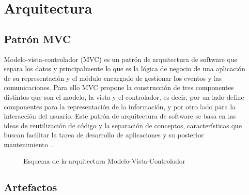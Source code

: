\chapter{Arquitectura}

\section{Patrón MVC}

Modelo-vista-controlador (MVC) es un patrón de arquitectura de software que separa los datos y principalmente lo que es la lógica de negocio de una aplicación de su representación y el módulo encargado de gestionar los eventos y las comunicaciones. Para ello MVC propone la construcción de tres componentes distintos que son el modelo, la vista y el controlador, es decir, por un lado define componentes para la representación de la información, y por otro lado para la interacción del usuario. Este patrón de arquitectura de software se basa en las ideas de reutilización de código y la separación de conceptos, características que buscan facilitar la tarea de desarrollo de aplicaciones y su posterior mantenimiento \cite{wiki-mvc}.

\begin{figure}[h]
    \centering
    \medskip
    \caption{Esquema de la arquitectura Modelo-Vista-Controlador}
\end{figure}

\section{Artefactos}

